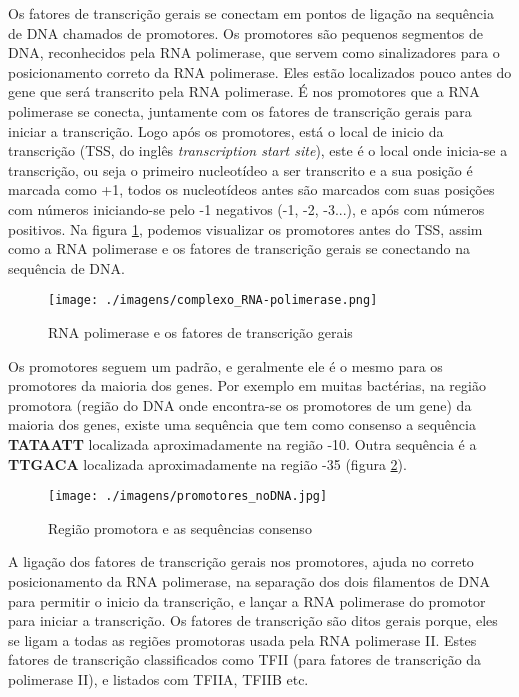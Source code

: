 Os fatores de transcrição gerais se conectam em pontos de ligação na sequência de DNA chamados de promotores. Os promotores são pequenos segmentos de DNA, reconhecidos pela RNA polimerase, que servem como sinalizadores para o posicionamento correto da RNA polimerase. Eles estão localizados pouco antes do gene que será transcrito pela RNA polimerase. É nos promotores que a RNA polimerase se conecta, juntamente com os fatores de transcrição gerais para iniciar a transcrição. Logo após os promotores, está o local de inicio da transcrição (TSS, do inglês \textit{transcription start site}), este é o local onde inicia-se a transcrição, ou seja o primeiro nucleotídeo a ser transcrito e a sua posição é marcada como +1, todos os nucleotídeos antes são marcados com suas posições com números iniciando-se pelo -1 negativos (-1, -2, -3...), e após com números positivos. Na figura \ref{fig:complexo_RNA-polimerase}, podemos visualizar os promotores antes do TSS, assim como a RNA polimerase e os fatores de transcrição gerais se conectando na sequência de DNA.

\begin{figure}[htb!]
    \centering
    \texttt{[image: ./imagens/complexo\_RNA-polimerase.png]}
    \caption{RNA polimerase e os fatores de transcrição gerais \cite[Adaptada]{Alberts2002} }
    \label{fig:complexo_RNA-polimerase}
\end{figure}

Os promotores seguem um padrão, e geralmente ele é o mesmo para os promotores da maioria dos genes. Por exemplo em muitas bactérias, na região promotora (região do DNA onde encontra-se os promotores de um gene) da maioria dos genes, existe uma sequência que tem como consenso a sequência \textbf{TATAATT} localizada aproximadamente na região -10. Outra sequência é a \textbf{TTGACA} localizada aproximadamente na região -35 (figura \ref{fig:promotores_noDNA}).

\begin{figure}[htb!]
    \centering
    \texttt{[image: ./imagens/promotores\_noDNA.jpg]}
    \caption{Região promotora e as sequências consenso}
    \label{fig:promotores_noDNA}
\end{figure}


A ligação dos fatores de transcrição gerais nos promotores, ajuda no correto posicionamento da RNA polimerase, na separação dos dois filamentos de DNA para permitir o inicio da transcrição, e lançar a RNA polimerase do promotor para iniciar a transcrição. Os fatores de transcrição são ditos gerais porque, eles se ligam a todas as regiões promotoras usada pela RNA polimerase II. Estes fatores de transcrição classificados como TFII (para fatores de transcrição da polimerase II), e listados com TFIIA, TFIIB etc. %

